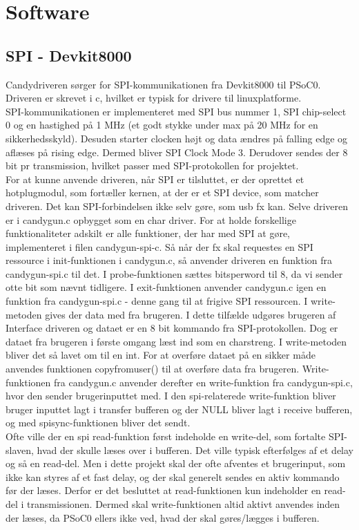 \section{Software}

\subsection{SPI - Devkit8000}
Candydriveren sørger for SPI-kommunikationen fra Devkit8000 til PSoC0. Driveren er skrevet i c, hvilket er typisk for drivere til linuxplatforme.\\
SPI-kommunikationen er implementeret med SPI bus nummer 1, SPI chip-select 0 og en hastighed på 1 MHz (et godt stykke under max på 20 MHz for en sikkerhedsskyld). Desuden starter clocken højt og data ændres på falling edge og aflæses på rising edge. Dermed bliver SPI Clock Mode 3. Derudover sendes der 8 bit pr transmission, hvilket passer med SPI-protokollen for projektet.\\
For at kunne anvende driveren, når SPI er tilsluttet, er der oprettet et hotplugmodul, som fortæller kernen, at der er et SPI device, som matcher driveren. Det kan SPI-forbindelsen ikke selv gøre, som usb fx kan. Selve driveren er i candygun.c opbygget som en char driver. For at holde forskellige funktionaliteter adskilt er alle funktioner, der har med SPI at gøre, implementeret i filen candygun-spi-c. Så når der fx skal requestes en SPI ressource i init-funktionen i candygun.c, så anvender driveren en funktion fra candygun-spi.c til det. I probe-funktionen sættes bits\textunderscore per\textunderscore word til 8, da vi sender otte bit som nævnt tidligere. I exit-funktionen anvender candygun.c igen en funktion fra candygun-spi.c - denne gang til at frigive SPI ressourcen. I write-metoden gives der data med fra brugeren. I dette tilfælde udgøres brugeren af Interface driveren og dataet er en 8 bit kommando fra SPI-protokollen. Dog er dataet fra brugeren i første omgang læst ind som en charstreng. I write-metoden bliver det så lavet om til en int.  For at overføre dataet på en sikker måde anvendes funktionen copy\textunderscore from\textunderscore user() til at overføre data fra brugeren. Write-funktionen fra candygun.c anvender derefter en write-funktion fra candygun-spi.c, hvor den sender brugerinputtet med. I den spi-relaterede write-funktion bliver bruger inputtet lagt i transfer bufferen og der NULL bliver lagt i receive bufferen, og med spi\textunderscore sync-funktionen bliver det sendt.\\ 
Ofte ville der en spi read-funktion først indeholde en write-del, som fortalte SPI-slaven, hvad der skulle læses over i bufferen. Det ville typisk efterfølges af et delay og så en read-del. Men i dette projekt skal der ofte afventes et brugerinput, som ikke kan styres af et fast delay, og der skal generelt sendes en aktiv kommando før der læses. Derfor er det besluttet at read-funktionen kun indeholder en read-del i transmissionen. Dermed skal write-funktionen altid aktivt anvendes inden der læses, da PSoC0 ellers ikke ved, hvad der skal gøres/lægges i bufferen.\\
